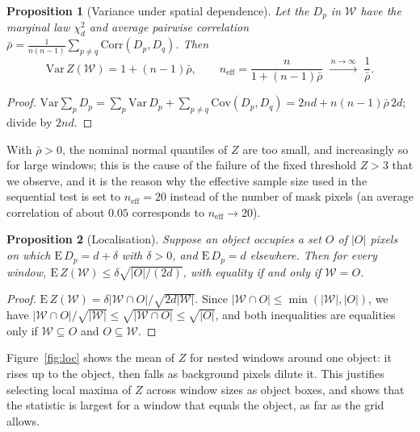 \documentclass[11pt,a4paper]{article}
\newtheorem{proposition}{Proposition}
\theoremstyle{definition}
\begin{document}
\begin{proposition}[Variance under spatial dependence]\label{prop:var}
Let the $D_p$ in $\mathcal W$ have the marginal law $\chi^2_d$ and average pairwise correlation $\bar\rho=\frac{1}{n(n-1)}\sum_{p\ne q}\mathrm{Corr}(D_p,D_q)$. Then
\[
\mathrm{Var}\,Z(\mathcal W)=1+(n-1)\bar\rho,\qquad n_{\mathrm{eff}}=\frac{n}{1+(n-1)\bar\rho}\;\xrightarrow{\,n\to\infty\,}\;\frac1{\bar\rho}.
\]
\end{proposition}
\begin{proof}
$\mathrm{Var}\sum_pD_p=\sum_p\mathrm{Var}\,D_p+\sum_{p\ne q}\mathrm{Cov}(D_p,D_q)=2nd+n(n-1)\bar\rho\,2d$; divide by $2nd$.
\end{proof}
With $\bar\rho>0$, the nominal normal quantiles of $Z$ are too small, and increasingly so for large windows; this is the cause of the failure of the fixed threshold $Z>3$ that we observe, and it is the reason why the effective sample size used in the sequential test is set to $n_{\mathrm{eff}}=20$ instead of the number of mask pixels (an average correlation of about $0.05$ corresponds to $n_{\mathrm{eff}}\to20$).

\begin{proposition}[Localisation]\label{prop:loc}
Suppose an object occupies a set $O$ of $|O|$ pixels on which $\mathrm{E}\,D_p=d+\delta$ with $\delta>0$, and $\mathrm{E}\,D_p=d$ elsewhere. Then for every window, $\mathrm{E}\,Z(\mathcal W)\le\delta\sqrt{|O|/(2d)}$, with equality if and only if $\mathcal W=O$.
\end{proposition}
\begin{proof}
$\mathrm{E}\,Z(\mathcal W)=\delta|\mathcal W\cap O|/\sqrt{2d|\mathcal W|}$. Since $|\mathcal W\cap O|\le\min(|\mathcal W|,|O|)$, we have $|\mathcal W\cap O|/\sqrt{|\mathcal W|}\le\sqrt{|\mathcal W\cap O|}\le\sqrt{|O|}$, and both inequalities are equalities only if $\mathcal W\subseteq O$ and $O\subseteq\mathcal W$.
\end{proof}
Figure~\ref{fig:loc} shows the mean of $Z$ for nested windows around one object: it rises up to the object, then falls as background pixels dilute it. This justifies selecting local maxima of $Z$ across window sizes as object boxes, and shows that the statistic is largest for a window that equals the object, as far as the grid allows.
\end{document}
